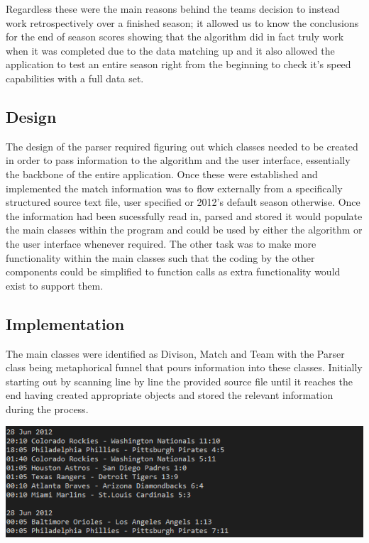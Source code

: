 Regardless these were the main reasons behind the teams decision to instead work retrospectively over a finished season; it allowed us to know the conclusions for the end of season scores showing that the algorithm did in fact truly work when it was completed due to the data matching up and it also allowed the application to test an entire season right from the beginning to check it's speed capabilities with a full data set.

\subsection{Design}
The design of the parser required figuring out which classes needed to be created in order to pass information to the algorithm and the user interface, essentially the backbone of the entire application. Once these were established and implemented the match information was to flow externally from a specifically structured source text file, user specified or 2012's default season otherwise. Once the information had been sucessfully read in, parsed and stored it would populate the main classes within the program and could be used by either the algorithm or the user interface whenever required. The other task was to make more functionality within the main classes such that the coding by the other components could be simplified to function calls as extra functionality would exist to support them.

\subsection{Implementation}

The main classes were identified as Divison, Match and Team with the Parser class being metaphorical funnel that pours information into these classes. Initially starting out by scanning line by line the provided source file until it reaches the end having created appropriate objects and stored the relevant information during the process.

\includegraphics[width=\linewidth,keepaspectratio]{images/sourceFileExample.png}

